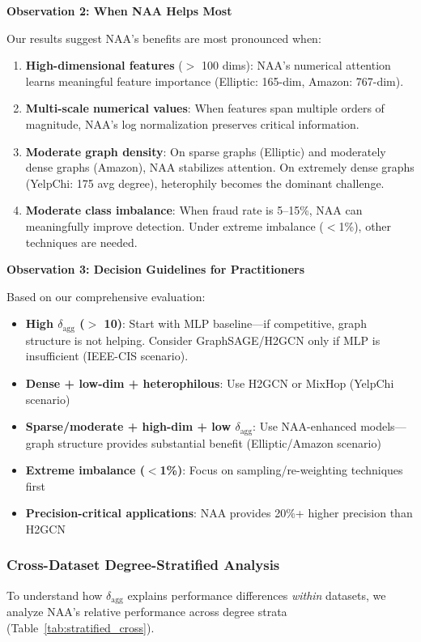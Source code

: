 \textbf{Observation 2: When NAA Helps Most}

Our results suggest NAA's benefits are most pronounced when:
\begin{enumerate}
\item \textbf{High-dimensional features} ($>$ 100 dims): NAA's numerical attention learns meaningful feature importance (Elliptic: 165-dim, Amazon: 767-dim).
\item \textbf{Multi-scale numerical values}: When features span multiple orders of magnitude, NAA's log normalization preserves critical information.
\item \textbf{Moderate graph density}: On sparse graphs (Elliptic) and moderately dense graphs (Amazon), NAA stabilizes attention. On extremely dense graphs (YelpChi: 175 avg degree), heterophily becomes the dominant challenge.
\item \textbf{Moderate class imbalance}: When fraud rate is 5--15\%, NAA can meaningfully improve detection. Under extreme imbalance ($<$1\%), other techniques are needed.
\end{enumerate}

\textbf{Observation 3: Decision Guidelines for Practitioners}

Based on our comprehensive evaluation:
\begin{itemize}
\item \textbf{High $\delta_{\text{agg}}$ ($>$ 10)}: Start with MLP baseline---if competitive, graph structure is not helping. Consider GraphSAGE/H2GCN only if MLP is insufficient (IEEE-CIS scenario).
\item \textbf{Dense + low-dim + heterophilous}: Use H2GCN or MixHop (YelpChi scenario)
\item \textbf{Sparse/moderate + high-dim + low $\delta_{\text{agg}}$}: Use NAA-enhanced models---graph structure provides substantial benefit (Elliptic/Amazon scenario)
\item \textbf{Extreme imbalance ($<$1\%)}: Focus on sampling/re-weighting techniques first
\item \textbf{Precision-critical applications}: NAA provides 20\%+ higher precision than H2GCN
\end{itemize}

\subsubsection{Cross-Dataset Degree-Stratified Analysis}

To understand how $\delta_{\text{agg}}$ explains performance differences \textit{within} datasets, we analyze NAA's relative performance across degree strata (Table~\ref{tab:stratified_cross}).

